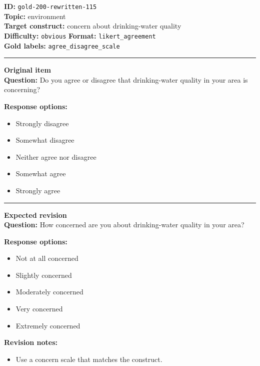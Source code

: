 \documentclass[10pt,a4paper]{article}
\newcommand{\sectionline}{\vspace{0.15em}\hrule\vspace{0.35em}}
\begin{document}
\begin{tcolorbox}[colframe=FlawRed,colback=white,colbacktitle=FlawRed!9,coltitle=black,title={Item 115\hfill Flawed item}]
\textbf{ID:} \texttt{gold-200-rewritten-115}\\
\textbf{Topic:} environment\\
\textbf{Target construct:} concern about drinking-water quality\\
\textbf{Difficulty:} \texttt{obvious} \quad \textbf{Format:} \texttt{likert\_agreement}\\
\textbf{Gold labels:} \texttt{agree\_disagree\_scale}\\
\sectionline
\textbf{Original item}\\
\textbf{Question:} Do you agree or disagree that drinking-water quality in your area is concerning?
\par\textbf{Response options:}
\begin{itemize}
\item Strongly disagree
\item Somewhat disagree
\item Neither agree nor disagree
\item Somewhat agree
\item Strongly agree
\end{itemize}
\sectionline
\textbf{Expected revision}\\
\textbf{Question:} How concerned are you about drinking-water quality in your area?
\par\textbf{Response options:}
\begin{itemize}
\item Not at all concerned
\item Slightly concerned
\item Moderately concerned
\item Very concerned
\item Extremely concerned
\end{itemize}
\par\textbf{Revision notes:}
\begin{itemize}
\item Use a concern scale that matches the construct.
\end{itemize}
\end{tcolorbox}
\end{document}
